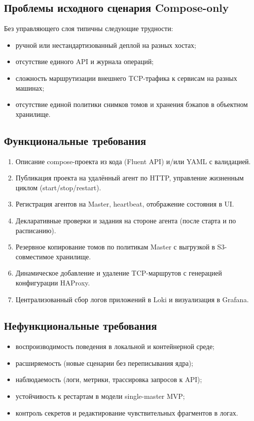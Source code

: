 \subsection{Проблемы исходного сценария Compose-only}

Без управляющего слоя типичны следующие трудности:
\begin{itemize}[leftmargin=1.5cm]
  \item ручной или нестандартизованный деплой на разных хостах;
  \item отсутствие единого API и журнала операций;
  \item сложность маршрутизации внешнего TCP-трафика к сервисам на разных машинах;
  \item отсутствие единой политики снимков томов и хранения бэкапов в объектном хранилище.
\end{itemize}

\subsection{Функциональные требования}

\begin{enumerate}[leftmargin=1.5cm]
  \item Описание compose-проекта из кода (Fluent API) и/или YAML с валидацией.
  \item Публикация проекта на удалённый агент по HTTP, управление жизненным циклом (start/stop/restart).
  \item Регистрация агентов на Master, heartbeat, отображение состояния в UI.
  \item Декларативные проверки и задания на стороне агента (после старта и по расписанию).
  \item Резервное копирование томов по политикам Master с выгрузкой в S3-совместимое хранилище.
  \item Динамическое добавление и удаление TCP-маршрутов с генерацией конфигурации HAProxy.
  \item Централизованный сбор логов приложений в Loki и визуализация в Grafana.
\end{enumerate}

\subsection{Нефункциональные требования}

\begin{itemize}[leftmargin=1.5cm]
  \item воспроизводимость поведения в локальной и контейнерной среде;
  \item расширяемость (новые сценарии без переписывания ядра);
  \item наблюдаемость (логи, метрики, трассировка запросов к API);
  \item устойчивость к рестартам в модели single-master MVP;
  \item контроль секретов и редактирование чувствительных фрагментов в логах.
\end{itemize}

